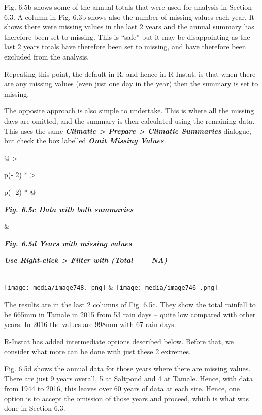 \documentclass[
  letterpaper,
  DIV=11,
  numbers=noendperiod]{scrreprt}
\begin{document}
Fig. 6.5b shows some of the annual totals that were used for analysis in
Section 6.3. A column in Fig. 6.3b shows also the number of missing
values each year. It shows there were missing values in the last 2 years
and the annual summary has therefore been set to missing. This is
``safe'' but it may be disappointing as the last 2 years totals have
therefore been set to missing, and have therefore been excluded from the
analysis.

Repeating this point, the default in R, and hence in R-Instat, is that
when there are any missing values (even just one day in the year) then
the summary is set to missing.

The opposite approach is also simple to undertake. This is where all the
missing days are omitted, and the summary is then calculated using the
remaining data. This uses the same \textbf{\emph{Climatic \textgreater{}
Prepare \textgreater{} Climatic Summaries}} dialogue, but check the box
labelled \textbf{\emph{Omit Missing Values}}.

\begin{longtable}[]{@{}
  >{\raggedright\arraybackslash}p{(\columnwidth - 2\tabcolsep) * }
  >{\raggedright\arraybackslash}p{(\columnwidth - 2\tabcolsep) * }@{}}
\toprule\noalign{}
\begin{minipage}[b]{\linewidth}\raggedright
\textbf{\emph{Fig. 6.5c Data with both summaries}}
\end{minipage} & \begin{minipage}[b]{\linewidth}\raggedright
\textbf{\emph{Fig. 6.5d Years with missing values}}

\textbf{\emph{Use Right-click \textgreater{} Filter with (Total == NA)}}
\end{minipage} \\
\midrule\noalign{}
\endhead
\bottomrule\noalign{}
\endlastfoot
\texttt{[image: media/image748. png]} &
\texttt{[image: media/image746 .png]} \\
\end{longtable}

The results are in the last 2 columns of Fig. 6.5c. They show the total
rainfall to be 665mm in Tamale in 2015 from 53 rain days -- quite low
compared with other years. In 2016 the values are 998mm with 67 rain
days.

R-Instat has added intermediate options described below. Before that, we
consider what more can be done with just these 2 extremes.

Fig. 6.5d shows the annual data for those years where there are missing
values. There are just 9 years overall, 5 at Saltpond and 4 at Tamale.
Hence, with data from 1944 to 2016, this leaves over 60 years of data at
each site. Hence, one option is to accept the omission of those years
and proceed, which is what was done in Section 6.3.
\end{document}
